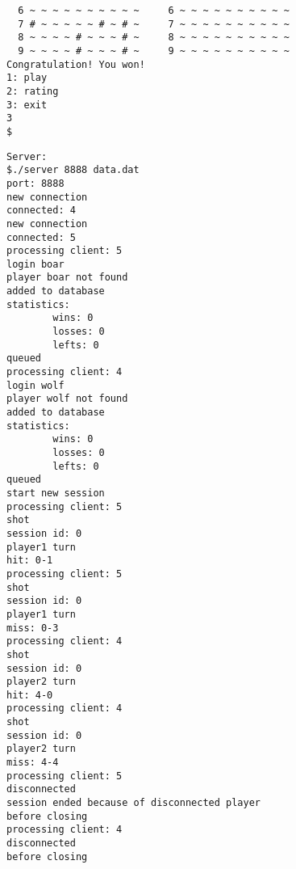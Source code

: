 \documentclass[12pt]{article}
\begin{document}
\begin{lstlisting}
  6 ~ ~ ~ ~ ~ ~ ~ ~ ~ ~     6 ~ ~ ~ ~ ~ ~ ~ ~ ~ ~  
  7 # ~ ~ ~ ~ ~ # ~ # ~     7 ~ ~ ~ ~ ~ ~ ~ ~ ~ ~                               
  8 ~ ~ ~ ~ # ~ ~ ~ # ~     8 ~ ~ ~ ~ ~ ~ ~ ~ ~ ~                               
  9 ~ ~ ~ ~ # ~ ~ ~ # ~     9 ~ ~ ~ ~ ~ ~ ~ ~ ~ ~                               
Congratulation! You won!                                                        
1: play                                                                         
2: rating                                                                       
3: exit                                                                         
3                                                                               
$ 
\end{lstlisting}
\begin{lstlisting}
Server:
$./server 8888 data.dat
port: 8888
new connection
connected: 4
new connection
connected: 5
processing client: 5
login boar
player boar not found
added to database
statistics:
        wins: 0
        losses: 0
        lefts: 0
queued
processing client: 4
login wolf
player wolf not found
added to database
statistics:
        wins: 0
        losses: 0
        lefts: 0
queued
start new session
processing client: 5
shot
session id: 0
player1 turn
hit: 0-1
processing client: 5
shot
session id: 0
player1 turn
miss: 0-3
processing client: 4
shot
session id: 0
player2 turn
hit: 4-0
processing client: 4
shot
session id: 0
player2 turn
miss: 4-4
processing client: 5
disconnected
session ended because of disconnected player
before closing
processing client: 4
disconnected
before closing
\end{lstlisting}
\end{document}
